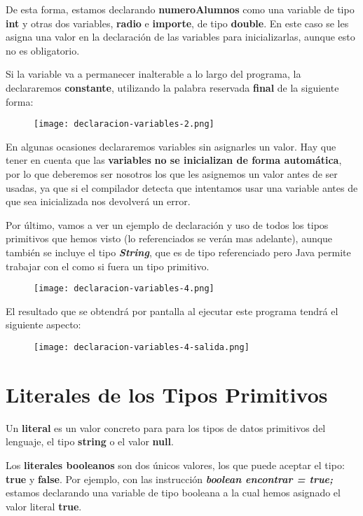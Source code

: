 De esta forma, estamos declarando \textbf{numeroAlumnos} como una variable de tipo \textbf{int} y otras dos variables, \textbf{radio} e \textbf{importe}, de tipo \textbf{double}. En este caso se les asigna una valor en la declaración de las variables para inicializarlas, aunque esto no es obligatorio.

Si la variable va a permanecer inalterable a lo largo del programa, la declararemos \textbf{constante}, utilizando la palabra reservada \textbf{final} de la siguiente forma:

\begin{figure}[H]
    \texttt{[image: declaracion-variables-2.png]}
\end{figure}

En algunas ocasiones declararemos variables sin asignarles un valor. Hay que tener en cuenta que las \textbf{variables} \textbf{no se inicializan de forma automática}, por lo que deberemos ser nosotros los que les asignemos un valor antes de ser usadas, ya que si el compilador detecta que intentamos usar una variable antes de que sea inicializada nos devolverá un error.

Por último, vamos a ver un ejemplo de declaración y uso de todos los tipos primitivos que hemos visto (lo referenciados se verán mas adelante), aunque también se incluye el tipo \textbf{\textit{String}}, que es de tipo referenciado pero Java permite trabajar con el como si fuera un tipo primitivo.

\begin{figure}[H]
    \texttt{[image: declaracion-variables-4.png]}
\end{figure}

El resultado que se obtendrá por pantalla al ejecutar este programa tendrá el siguiente aspecto:

\begin{figure}[H]
    \texttt{[image: declaracion-variables-4-salida.png]}
\end{figure}

\section{Literales de los Tipos Primitivos}
Un \textbf{literal} es un valor concreto para para los tipos de datos primitivos del lenguaje, el tipo \textbf{string} o el valor \textbf{null}.

Los \textbf{literales booleanos} son dos únicos valores, los que puede aceptar el tipo: \textbf{true} y \textbf{false}. Por ejemplo, con las instrucción \textbf{\textit{boolean encontrar = true;}} estamos declarando una variable de tipo booleana a la cual hemos asignado el valor literal \textbf{true}.

